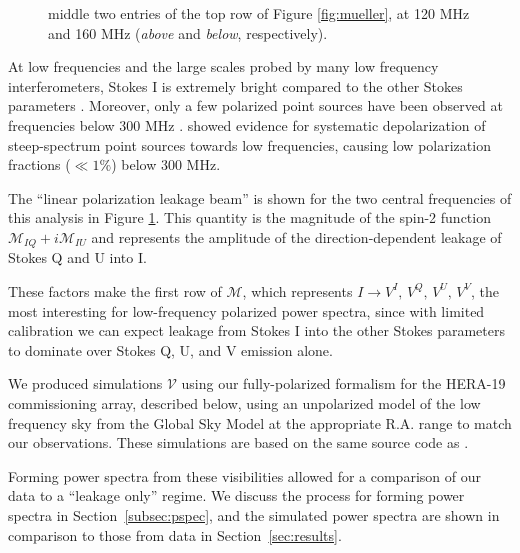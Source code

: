 \documentclass[twocolumn, trackchanges]{aastex61}
\begin{document}
\begin{figure}
{    middle two entries of the top row of Figure \ref{fig:mueller}, at 120 MHz
    and 160 MHz (\textit{above} and \textit{below}, respectively).
}
\label{fig:lin_pol_beam}
\end{figure}


At low frequencies and the large scales probed by many low frequency
interferometers, Stokes I is extremely bright compared to the other Stokes
parameters \citep{Bernardi.09, Bernardi.10, Jelic.14, Jelic.15, Asad15, Kohn16,
  Lenc.17, Moore17}. Moreover, only a few polarized point sources have been
observed at frequencies below 300 MHz \citep{Bernardi.13, Asad.16,
  Lenc.17}. \cite{Farnes.14} showed evidence for systematic depolarization of
steep-spectrum point sources towards low frequencies, causing low polarization
fractions ($\ll 1\%$) below 300 MHz.

The ``linear polarization leakage beam'' is shown for the two central
frequencies of this analysis in Figure \ref{fig:lin_pol_beam}.  This quantity is
the magnitude of the spin-2 function $\mathcal{M}_{IQ} + i \mathcal{M}_{IU}$ and
represents the amplitude of the direction-dependent leakage of Stokes Q and U
into I.

These factors make the first row of $\mathcal{M}$, which represents
$I\rightarrow V^I,\,V^Q,\,V^U,\,V^V$, the most interesting for low-frequency
polarized power spectra, since with limited calibration we can expect leakage
from Stokes I into the other Stokes parameters to dominate over Stokes Q, U, and
V emission alone.

We produced simulations $\mathcal{V}$ using our fully-polarized formalism for
the HERA-19 commissioning array, described below, using an unpolarized model of
the low frequency sky from the Global Sky Model \citep[GSM;][]{GSM.08, pygsm,
  GSM.17} at the appropriate R.A. range to match our observations. These
simulations are based on the same source code as \citet{Martinot18}.

Forming power spectra from these visibilities allowed for a comparison of our
data to a ``leakage only'' regime. We discuss the process for forming power
spectra in Section~\ref{subsec:pspec}, and the simulated power spectra are shown
in comparison to those from data in Section~\ref{sec:results}.
\end{document}
